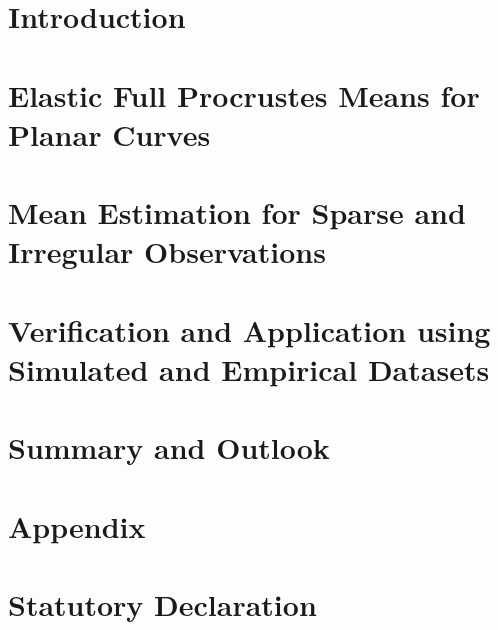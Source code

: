 \documentclass[a4paper,12pt,english,headings=small,oneside]{scrreprt}
\theoremstyle{plain}
\theoremstyle{definition}
\theoremstyle{remark}
\theoremstyle{plain}
\begin{document}
\listoftodos



\newpage
{}
\chapter{Introduction}


\newpage
\chapter{Elastic Full Procrustes Means for Planar Curves}


\newpage
\chapter{Mean Estimation for Sparse and Irregular Observations}


\newpage
\chapter{Verification and Application using Simulated and Empirical Datasets}


\newpage
\chapter{Summary and Outlook}




\newpage
\printbibliography[heading=bibintoc] %




\newpage
\appendix
\chapter{Appendix}


%

\newpage
\chapter*{Statutory Declaration}


%

\end{document}
